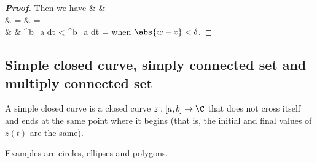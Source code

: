 \begin{proof}[\bf Proof]
Then we have
\beast
& &  \\
& = &  =  \\
& \leq & \int^b_a  dt <   \int^b_a dt = \ve 
\eeast
when $\abs{w-z} < \delta$.
\end{proof}




\subsection{Simple closed curve, simply connected set and multiply connected set}


\begin{definition}
A simple closed curve is a closed curve $z:[a,b]\to \C$ that does not cross itself and ends at the same point where it begins (that is, the initial and final values of $z(t)$ are the same).
\end{definition}

\begin{remark}
Examples are circles, ellipses and polygons.
\end{remark}




